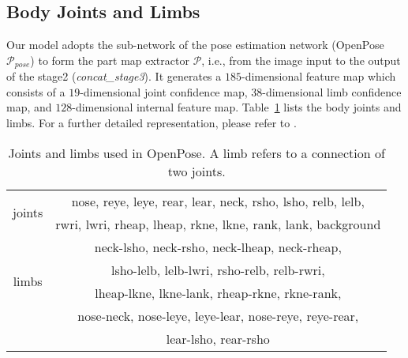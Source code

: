 \documentclass{llncs}
\begin{document}
\subsection{Body Joints and Limbs}
Our model adopts the sub-network of the pose estimation network (OpenPose~\cite{conf/cvpr/cao17} $\mathcal{P}_{pose}$) to form the part map extractor $\mathcal{P}$, i.e., from the image input to the output of the stage2 ({\it concat\_stage3}). It generates a $185$-dimensional feature map which consists of a $19$-dimensional joint confidence map, $38$-dimensional limb confidence map, and $128$-dimensional internal feature map. Table~\ref{table:body_part} lists the body joints and limbs. For a further detailed representation, please refer to \cite{conf/cvpr/cao17}.



\begin{table}[t]
\fontsize{9}{9}\selectfont
\begin{center}
\centering
\caption{Joints and limbs used in OpenPose.
A limb refers to a connection of two joints.
}\vspace{-.3cm}
\label{table:body_part}
\begin{tabular}[pos]{|c |c|}
\hline
\multirow{2}{*}{joints} & nose, reye, leye, rear, lear, neck, rsho, lsho, relb, lelb, \\
& rwri, lwri, rheap, lheap, rkne, lkne, rank, lank, background\\ \hline
\multirow{4}{*}{limbs} & neck-lsho, neck-rsho, neck-lheap, neck-rheap,\\
& lsho-lelb, lelb-lwri, rsho-relb, relb-rwri,  \\
& lheap-lkne, lkne-lank, rheap-rkne, rkne-rank,\\
& nose-neck, nose-leye, leye-lear, nose-reye, reye-rear, \\
& lear-lsho, rear-rsho\\ \hline
\end{tabular}
 \vspace{-0.5cm}
\end{center}
\end{table}
\end{document}
